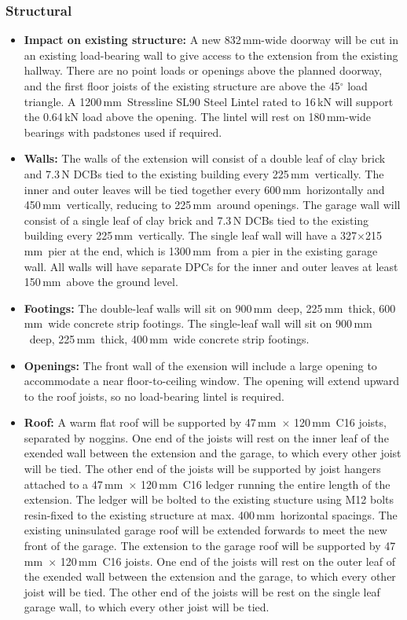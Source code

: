 \documentclass{extension}
\newcommand{\mm}{\,$\mathrm{mm}$}
\begin{document}
\subsubsection{Structural}
\begin{itemize}
  \item {\bf Impact on existing structure:} A new 832\mm -wide doorway will be cut in an existing load-bearing wall to give access to the extension from the existing hallway. There are no point loads or openings above the planned doorway, and the first floor joists of the existing structure are above the 45$^\circ$ load triangle. A 1200\mm\ Stressline SL90 Steel Lintel rated to 16\,kN will support the 0.64\,kN load above the opening. The lintel will rest on 180\mm -wide bearings with padstones used if required.
  \item {\bf Walls:} The walls of the extension will consist of a double leaf of clay brick and 7.3\,N DCBs tied to the existing building every 225\mm\ vertically. The inner and outer leaves will be tied together every 600\mm\ horizontally and 450\mm\ vertically, reducing to 225\mm\ around openings. The garage wall will consist of a single leaf of clay brick and 7.3\,N DCBs tied to the existing building every 225\mm\ vertically. The single leaf wall will have a 327$\times$215\mm\ pier at the end, which is 1300\mm\ from a pier in the existing garage wall. All walls will have separate DPCs for the inner and outer leaves at least 150\mm\ above the ground level.
  \item {\bf Footings:} The double-leaf walls will sit on 900\mm\ deep, 225\mm\ thick, 600\mm\ wide concrete strip footings. The single-leaf wall will sit on 900\mm\ deep, 225\mm\ thick, 400\mm\ wide concrete strip footings.
  \item {\bf Openings:} The front wall of the exension will include a large opening to accommodate a near floor-to-ceiling window. The opening will extend upward to the roof joists, so no load-bearing lintel is required.
  \item {\bf Roof:} A warm flat roof will be supported by 47\mm\ $\times$ 120\mm\ C16 joists, separated by noggins. One end of the joists will rest on the inner leaf of the exended wall between the extension and the garage, to which every other joist will be tied. The other end of the joists will be supported by joist hangers attached to a 47\mm\ $\times$ 120\mm\ C16 ledger running the entire length of the extension. The ledger will be bolted to the existing stucture using M12 bolts resin-fixed to the existing structure at max. 400\mm\ horizontal spacings. The existing uninsulated garage roof will be extended forwards to meet the new front of the garage. The extension to the garage roof will be supported by 47\mm\ $\times$ 120\mm\ C16 joists. One end of the joists will rest on the outer leaf of the exended wall between the extension and the garage, to which every other joist will be tied. The other end of the joists will be rest on the single leaf garage wall, to which every other joist will be tied.

\end{itemize}
\end{document}
